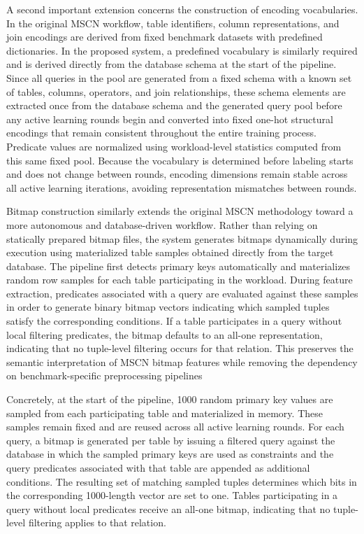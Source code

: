 A second important extension concerns the construction of encoding vocabularies. In the original MSCN workflow, table identifiers, column representations, and join encodings are derived from fixed benchmark datasets with predefined dictionaries. In the proposed system, a predefined vocabulary is similarly required and is derived directly from the database schema at the start of the pipeline. Since all queries in the pool are generated from a fixed schema with a known set of tables, columns, operators, and join relationships, these schema elements are extracted once from the database schema and the generated query pool before any active learning rounds begin and converted into fixed one-hot structural encodings that remain consistent throughout the entire training process. Predicate values are normalized using workload-level statistics computed from this same fixed pool. Because the vocabulary is determined before labeling starts and does not change between rounds, encoding dimensions remain stable across all active learning iterations, avoiding representation mismatches between rounds.

Bitmap construction similarly extends the original MSCN methodology toward a more autonomous and database-driven workflow. Rather than relying on statically prepared bitmap files, the system generates bitmaps dynamically during execution using materialized table samples obtained directly from the target database. The pipeline first detects primary keys automatically and materializes random row samples for each table participating in the workload. During feature extraction, predicates associated with a query are evaluated against these samples in order to generate binary bitmap vectors indicating which sampled tuples satisfy the corresponding conditions. If a table participates in a query without local filtering predicates, the bitmap defaults to an all-one representation, indicating that no tuple-level filtering occurs for that relation. This preserves the semantic interpretation of MSCN bitmap features while removing the dependency on benchmark-specific preprocessing pipelines

Concretely, at the start of the pipeline, 1000 random primary key values are sampled from each participating table and materialized in memory. These samples remain fixed and are reused across all active learning rounds. For each query, a bitmap is generated per table by issuing a filtered query against the database in which the sampled primary keys are used as constraints and the query predicates associated with that table are appended as additional conditions. The resulting set of matching sampled tuples determines which bits in the corresponding 1000-length vector are set to one. Tables participating in a query without local predicates receive an all-one bitmap, indicating that no tuple-level filtering applies to that relation.

